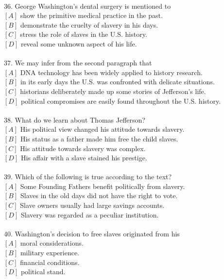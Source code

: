\documentclass[a4paper]{article}
\begin{document}
\\36.	George Washington’s dental surgery is mentioned to\\$[A]$ show the primitive medical practice in the past.\\$[B]$ demonstrate the cruelty of slavery in his days.\\$[C]$ stress the role of slaves in the U.S. history.\\$[D]$ reveal some unknown aspect of his life.\\\\37.	We may infer from the second paragraph that\\$[A]$ DNA technology has been widely applied to history research.\\$[B]$ in its early days the U.S. was confronted with delicate situations.\\$[C]$ historians deliberately made up some stories of Jefferson’s life.\\$[D]$ political compromises are easily found throughout the U.S. history.\\\\38.	What do we learn about Thomas Jefferson?\\$[A]$ His political view changed his attitude towards slavery.\\$[B]$ His status as a father made him free the child slaves.\\$[C]$ His attitude towards slavery was complex.\\$[D]$ His affair with a slave stained his prestige.\\\\39.	Which of the following is true according to the text?\\$[A]$ Some Founding Fathers benefit politically from slavery.\\$[B]$ Slaves in the old days did not have the right to vote.\\$[C]$ Slave owners usually had large savings accounts.\\$[D]$ Slavery was regarded as a peculiar institution.\\\\40.	Washington’s decision to free slaves originated from his\\$[A]$ moral considerations.\\$[B]$ military experience.\\$[C]$ financial conditions.\\$[D]$ political stand.\\
\end{document}
